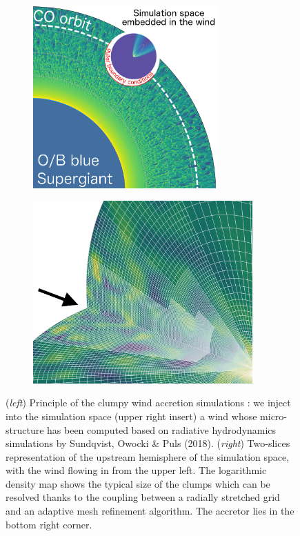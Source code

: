 \documentclass[letterpaper,12pt,onecolumn]{article}
\begin{document}
\begin{figure}[!t]
\begin{subfigure}{0.45\columnwidth}
  \centering
  \includegraphics[height=7cm]{Figures/config_SgXB_clumps.png}	
\end{subfigure}%
\begin{subfigure}{0.45\columnwidth}
  \centering
  \hspace*{0.25cm}
  \includegraphics[height=7cm]{Figures/mesh.jpeg}	
\end{subfigure}
\caption{(\textit{left}) Principle of the clumpy wind accretion simulations : we inject into the simulation space (upper right insert) a wind whose micro-structure has been computed based on radiative hydrodynamics simulations by Sundqvist, Owocki \& Puls (2018). (\textit{right}) Two-slices representation of the upstream hemisphere of the simulation space, with the wind flowing in from the upper left. The logarithmic density map shows the typical size of the clumps which can be resolved thanks to the coupling between a radially stretched grid and an adaptive mesh refinement algorithm. The accretor lies in the bottom right corner.}
\label{fig:config_SgXB_and_mesh}
\end{figure}
\end{document}
